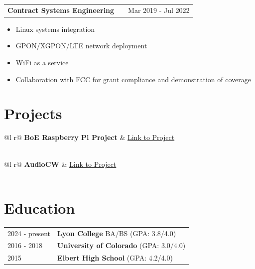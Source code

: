 \documentclass[a4paper,12pt]{article}
\makeatletter
\newenvironment{joblong}[2]
    {
    \begin{tabularx}{\linewidth}{@{}l X r@{}}
    \textbf{#1} & \hfill &  #2 \\[3.75pt]
    \end{tabularx}
    \begin{minipage}[t]{\linewidth}
    \begin{itemize}[nosep,after=\strut, leftmargin=1em, itemsep=3pt,label=--]
    }
    {
    \end{itemize}
    \end{minipage}
    }
\makeatother
\begin{document}
\begin{joblong}{Contract Systems Engineering}{Mar 2019 - Jul 2022}
\item Linux systems integration
\item GPON/XGPON/LTE network deployment
\item WiFi as a service
\item Collaboration with FCC for grant compliance and demonstration of coverage
\end{joblong}

\section{Projects}

\begin{tabularx}{\linewidth}{ @{}l r@{} }
\textbf{BoE Raspberry Pi Project} & \hfill \href{https://github.com/allhailthetail/boenanna-pi}{Link to Project} \\[3.75pt]
  \\
\end{tabularx}

\begin{tabularx}{\linewidth}{ @{}l r@{} }
\textbf{AudioCW} & \hfill \href{https://github.com/allhailthetail/audiocw}{Link to Project} \\[3.75pt]
  \\
\end{tabularx}

\section{Education}
\begin{tabularx}{\linewidth}{@{}l X@{}}
2024 - present & \textbf{Lyon College} BA/BS \hfill \normalsize (GPA: 3.8/4.0) \\

2016 - 2018 & \textbf{University of Colorado} \hfill  (GPA: 3.0/4.0) \\

2015 & \textbf{Elbert High School} \hfill  (GPA: 4.2/4.0) \\
\end{tabularx}
\end{document}
